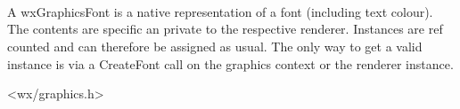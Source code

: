 
\section{}\label{wxgraphicsfont}


\\

A wxGraphicsFont is a native representation of a font (including text colour). The contents are specific an private to the respective renderer. Instances are ref counted 
and can therefore be assigned as usual. The only way to get a valid instance is via a CreateFont call on the graphics context or the renderer instance.


<wx/graphics.h>




